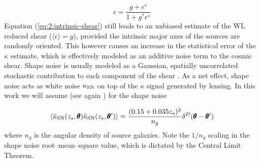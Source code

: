 \begin{equation}
\label{eq:2:intrinsic-shear}
\epsilon = \frac{g+\epsilon^s}{1+g^*\epsilon^s}
\end{equation}
%
Equation (\ref{eq:2:intrinsic-shear}) still leads to an unbiased estimate of the WL reduced shear ($\langle\epsilon\rangle=g$), provided the intrinsic major axes of the sources are randomly oriented. This however causes an increase in the statistical error of the $\kappa$ estimate, which is effectively modeled as an additive noise term to the cosmic shear. Shape noise is usually modeled as a Gaussian, spatially uncorrelated stochastic contribution to each component of the shear \citep{SongKnox}. As a net effect, shape noise acts as white noise $\kappa_{\rm SN}$ on top of the $\kappa$ signal generated by lensing. In this work we will assume (see again \citep{SongKnox}) for the shape noise

\begin{equation}
\label{eq:2:shapenoise}
\left\langle\hat{\kappa}_{\rm SN}(z_s,\pmb{\theta})\hat{\kappa}_{\rm SN}(z_s,\pmb{\theta}')\right\rangle = \frac{(0.15+0.035z_s)^2}{n_g}\delta^D(\pmb{\theta}-\pmb{\theta}')
\end{equation} 
%
where $n_g$ is the angular density of source galaxies. Note the $1/n_g$ scaling in the shape noise root--mean--square value, which is dictated by the Central Limit Theorem.    

